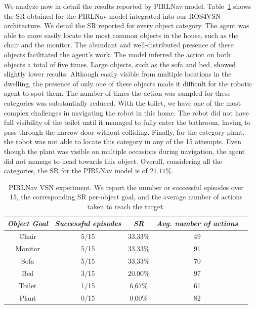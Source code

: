 We analyze now in detail the results reported by PIRLNav model.
Table~\ref{tab:pirlnav} shows the SR obtained for the PIRLNav model integrated into our ROS4VSN architecture.
We detail the SR reported for every object category.
The agent was able to more easily locate the most common objects in the house, such as the chair and the monitor.
The abundant and well-distributed presence of these objects facilitated the agent's work.
The model inferred the action \stopac on both objects a total of five times.
Large objects, such as the sofa and bed, showed slightly lower results.
Although easily visible from multiple locations in the dwelling, the presence of only one of these objects made it difficult for the robotic agent to spot them.
The number of times the \stopac action was sampled for these categories was substantially reduced.
With the toilet, we have one of the most complex challenges in navigating the robot in this home.
The robot did not have full visibility of the toilet until it managed to fully enter the bathroom, having to pass through the narrow door without colliding.
Finally, for the category plant, the robot was not able to locate this category in any of the 15 attempts.
Even though the plant was visible on multiple occasions during navigation, the agent did not manage to head towards this object.
Overall, considering all the categories, the SR for the PIRLNav model is of $21.11\%$.


\begin{table}[t]
\centering
\begin{tabular}{c|cccc}
\toprule
\textit{\textbf{Object Goal}} & \textit{\textbf{Successful episodes}} & \textit{\textbf{SR}} &  \textit{\textbf{Avg. number of actions}}   \\ \midrule
Chair                & 5/15     & 33,33\%   &   49  \\
Monitor              & 5/15     & 33,33\%   &   91  \\
Sofa                 & 5/15     & 33,33\%   &   70  \\
Bed                  & 3/15     & 20,00\%   &   97  \\
Toilet               & 1/15     & 6,67\%    &   61  \\
Plant                & 0/15     & 0,00\%    &   82  \\ \bottomrule
\end{tabular}
\caption{PIRLNav VSN experiment. We report the number or successful episodes over 15, the corresponding SR per-object goal, and the average number of actions taken to reach the target.}
\label{tab:pirlnav}
\end{table}

